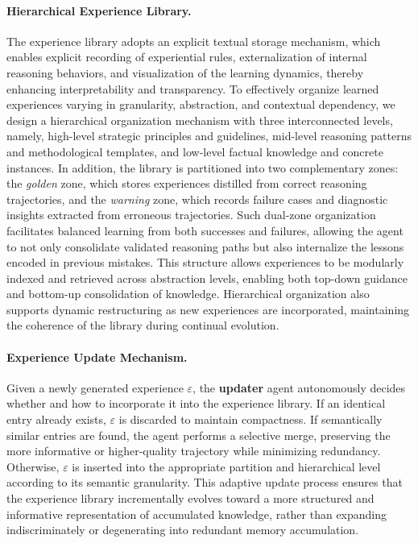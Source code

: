 \paragraph{Hierarchical Experience Library.}
The experience library adopts an explicit textual storage mechanism, which enables explicit recording of experiential rules, externalization of internal reasoning behaviors, and visualization of the learning dynamics, thereby enhancing interpretability and transparency.
To effectively organize learned experiences varying in granularity, abstraction, and contextual dependency, we design a hierarchical organization mechanism with three interconnected levels, namely, high-level strategic principles and guidelines, mid-level reasoning patterns and methodological templates, and low-level factual knowledge and concrete instances.
In addition, the library is partitioned into two complementary zones: the \textit{golden} zone, which stores experiences distilled from correct reasoning trajectories, and the \textit{warning} zone, which records failure cases and diagnostic insights extracted from erroneous trajectories.
Such dual-zone organization facilitates balanced learning from both successes and failures, allowing the agent to not only consolidate validated reasoning paths but also internalize the lessons encoded in previous mistakes.
This structure allows experiences to be modularly indexed and retrieved across abstraction levels, enabling both top-down guidance and bottom-up consolidation of knowledge.
Hierarchical organization also supports dynamic restructuring as new experiences are incorporated, maintaining the coherence of the library during continual evolution.

\paragraph{Experience Update Mechanism.}
Given a newly generated experience $\varepsilon$, the \textbf{updater} agent autonomously decides whether and how to incorporate it into the experience library. 
If an identical entry already exists, $\varepsilon$ is discarded to maintain compactness. 
If semantically similar entries are found, the agent performs a selective merge, preserving the more informative or higher-quality trajectory while minimizing redundancy. 
Otherwise, $\varepsilon$ is inserted into the appropriate partition and hierarchical level according to its semantic granularity. 
This adaptive update process ensures that the experience library incrementally evolves toward a more structured and informative representation of accumulated knowledge, rather than expanding indiscriminately or degenerating into redundant memory accumulation.

